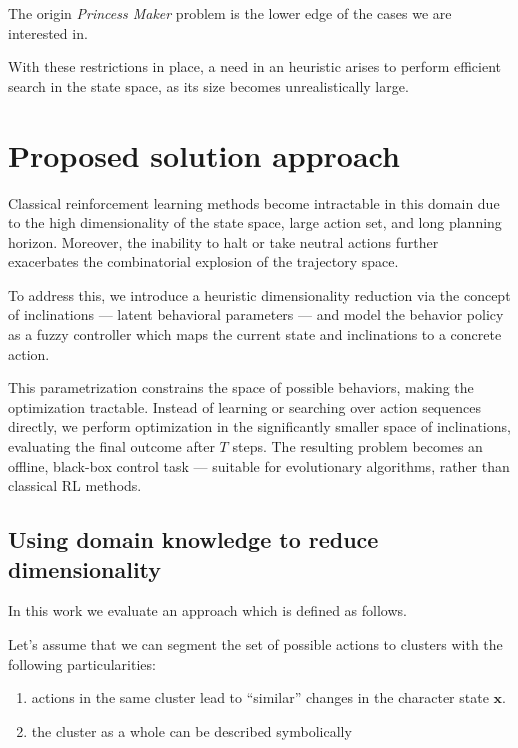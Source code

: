 \documentclass[12pt, a4paper]{report}
\begin{document}
	The origin \textit{Princess Maker} problem is the lower edge of the cases we are interested in.

	With these restrictions in place, a need in an heuristic arises to perform efficient search in the state space, as its size becomes unrealistically large.
	
	\chapter{Proposed solution approach}\label{section::solution}

Classical reinforcement learning methods become intractable in this domain due to the high dimensionality of the state space, large action set, and long planning horizon. Moreover, the inability to halt or take neutral actions further exacerbates the combinatorial explosion of the trajectory space.

To address this, we introduce a heuristic dimensionality reduction via the concept of inclinations — latent behavioral parameters — and model the behavior policy as a fuzzy controller which maps the current state and inclinations to a concrete action.

This parametrization constrains the space of possible behaviors, making the optimization tractable. Instead of learning or searching over action sequences directly, we perform optimization in the significantly smaller space of inclinations, evaluating the final outcome after $T$ steps. The resulting problem becomes an offline, black-box control task — suitable for evolutionary algorithms, rather than classical RL methods.

	\section{Using domain knowledge to reduce dimensionality}

	In this work we evaluate an approach which is defined as follows.
	
	Let's assume that we can segment the set of possible actions to clusters with the following particularities:
	
	\begin{enumerate}
		\item actions in the same cluster lead to ``similar'' changes in the character state $\mathbf{x}$.
		\item the cluster as a whole can be described symbolically
	\end{enumerate}
	
\end{document}
